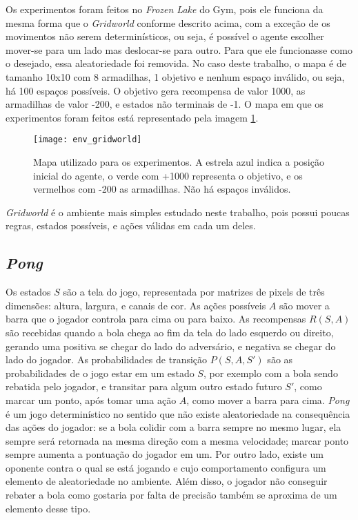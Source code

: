 Os experimentos foram feitos no \textit{Frozen Lake} do Gym, pois ele funciona da mesma forma que o \textit{Gridworld} conforme descrito acima, com a exceção de os movimentos não serem determinísticos, ou seja, é possível o agente escolher mover-se para um lado mas deslocar-se para outro.
Para que ele funcionasse como o desejado, essa aleatoriedade foi removida.
No caso deste trabalho, o mapa é de tamanho 10x10 com 8 armadilhas, 1 objetivo e nenhum espaço inválido, ou seja, há 100 espaços possíveis.
O objetivo gera recompensa de valor 1000, as armadilhas de valor -200, e estados não terminais de -1.
O mapa em que os experimentos foram feitos está representado pela imagem \ref{fig:env_grid}.

\begin{figure}[h!]
  \centering
  \texttt{[image: env\_gridworld]}
  \caption{Mapa utilizado para os experimentos. A estrela azul indica a posição inicial do agente, o verde com +1000 representa o objetivo, e os vermelhos com -200 as armadilhas. Não há espaços inválidos.}
  \label{fig:env_grid}
\end{figure}

\textit{Gridworld} é o ambiente mais simples estudado neste trabalho, pois possui poucas regras, estados possíveis, e ações válidas em cada um deles.

\subsection{\textit{Pong}}
\label{sec:env_pong}

Os estados $S$ são a tela do jogo, representada por matrizes de pixels de três dimensões: altura, largura, e canais de cor.
As ações possíveis $A$ são mover a barra que o jogador controla para cima ou para baixo.
As recompensas $R(S,A)$ são recebidas quando a bola chega ao fim da tela do lado esquerdo ou direito, gerando uma positiva se chegar do lado do adversário, e negativa se chegar do lado do jogador.
As probabilidades de transição $P(S,A,S')$ são as probabilidades de o jogo estar em um estado $S$, por exemplo com a bola sendo rebatida pelo jogador, e transitar para algum outro estado futuro $S'$, como marcar um ponto, após tomar uma ação $A$, como mover a barra para cima.
\textit{Pong} é um jogo determinístico no sentido que não existe aleatoriedade na consequência das ações do jogador: se a bola colidir com a barra sempre no mesmo lugar, ela sempre será retornada na mesma direção com a mesma velocidade; marcar ponto sempre aumenta a pontuação do jogador em um.
Por outro lado, existe um oponente contra o qual se está jogando e cujo comportamento configura um elemento de aleatoriedade no ambiente.
Além disso, o jogador não conseguir rebater a bola como gostaria por falta de precisão também se aproxima de um elemento desse tipo.

